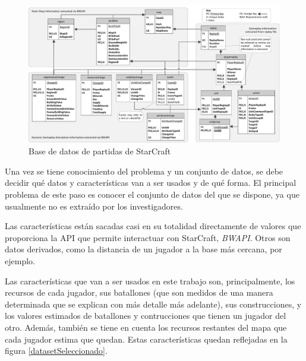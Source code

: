 \documentclass[a4paper,11pt]{book}\usepackage[]{graphicx}\usepackage[]{color}
\makeatletter
\def\maxwidth{ %
  \ifdim\Gin@nat@width>\linewidth
    \linewidth
  \else
    \Gin@nat@width
  \fi
}
\makeatother
\begin{document}
\begin{figure}
    \centering
    \includegraphics[width=\maxwidth]{figure/Robertson14DatabaseDiagram}
    \caption{Base de datos de partidas de StarCraft}
    \label{dataset}
\end{figure}



Una vez se tiene conocimiento del problema y un conjunto de datos, se
debe decidir qué datos y características van a ser usados y de qué
forma. El principal problema de este paso es conocer el conjunto de
datos del que se dispone, ya que usualmente no es extraído por los
investigadores.

Las características están sacadas casi en su totalidad directamente de
valores que proporciona la API que permite interactuar con StarCraft,
\emph{BWAPI}. Otros son datos derivados, como la distancia de un
jugador a la base más cercana, por ejemplo.

Las características que van a ser usados en este trabajo son,
principalmente, los recursos de cada jugador, sus batallones (que son
medidos de una manera determinada que se explican con más detalle más
adelante), sus construcciones, y los valores estimados de batallones y
contrucciones que tienen un jugador del otro. Además, también se tiene
en cuenta los recursos restantes del mapa que cada jugador estima que
quedan. Estas características quedan reflejadas en la figura
\ref{datasetSeleccionado}.
\end{document}
